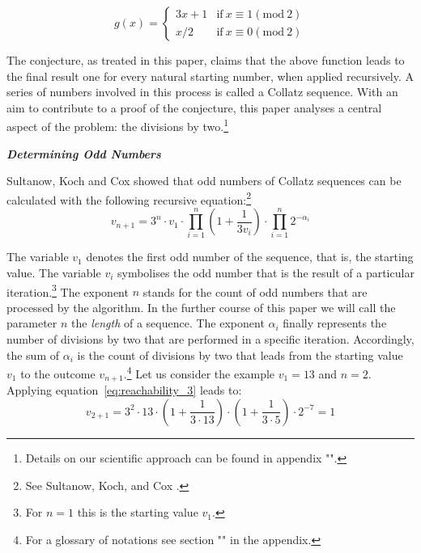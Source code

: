 \documentclass{SciPress_2015}
\renewcommand{\subsection}[1]{\textit{\textbf{#1}}}
\begin{document}
\begin{equation}
\label{eq:func_collatz}
g(x)=
\begin{cases}
3x+1	&	\text{if}\ x\equiv 1(\textrm{mod}\ 2)\\
x/2		&	\text{if}\ x\equiv 0(\textrm{mod}\ 2)
\end{cases}
\end{equation}

The conjecture, as treated in this paper, claims that the above function leads to the final result one for every natural starting number, when applied recursively. A series of numbers involved in this process is called a Collatz sequence. With an aim to contribute to a proof of the conjecture, this paper analyses a central aspect of the problem: the divisions by two.\footnote{Details on our scientific approach can be found in appendix "".}

\vspace{1em}\noindent
\subsection{Determining Odd Numbers}
\par\noindent
Sultanow, Koch and Cox showed that odd numbers of Collatz sequences can be calculated with the following recursive equation:\footnote{See Sultanow, Koch, and Cox \cite[p.~10]{Ref_Sultanow_Koch_Cox_2020}.}
\begin{equation}
\label{eq:reachability_3}
v_{n+1}=3^n\cdot v_1\cdot\prod_{i=1}^{n}\left(1+\frac{1}{3v_{i}}\right)\cdot\prod_{i=1}^{n}2^{-\alpha_i}
\end{equation}

The variable $v_1$ denotes the first odd number of the sequence, that is, the starting value. The variable $v_i$ symbolises the odd number that is the result of a particular iteration.\footnote{For $n=1$ this is the starting value $v_1$.} The exponent $n$ stands for the count of odd numbers that are processed by the algorithm. In the further course of this paper we will call the parameter $n$ the \textit{length} of a sequence. The exponent $\alpha_i$ finally represents the number of divisions by two that are performed in a specific iteration. Accordingly, the sum of $\alpha_i$ is the count of divisions by two that leads from the starting value $v_1$  to the outcome $v_{n+1}$.\footnote{For a glossary of notations see section "" in the appendix.} Let us consider the example $v_1=13$ and $n=2$. Applying equation~\ref{eq:reachability_3} leads to:
\[
v_{2+1}=3^2\cdot 13\cdot\left(1+\frac{1}{3\cdot13}\right)\cdot\left(1+\frac{1}{3\cdot5}\right)\cdot2^{-7}=1
\]
\end{document}
